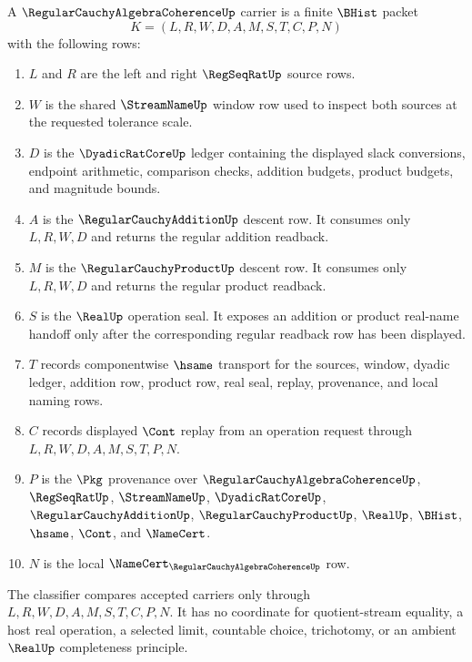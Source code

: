 \begin{definition}
\label{def:regular-cauchy-algebra-coherence-carrier}
A $\RegularCauchyAlgebraCoherenceUp$ carrier is a finite $\BHist$ packet
$$
K=(L,R,W,D,A,M,S,T,C,P,N)
$$
with the following rows:
\begin{enumerate}
\item $L$ and $R$ are the left and right $\RegSeqRatUp$ source rows.
\item $W$ is the shared $\StreamNameUp$ window row used to inspect both sources at the requested tolerance scale.
\item $D$ is the $\DyadicRatCoreUp$ ledger containing the displayed slack conversions, endpoint arithmetic, comparison checks, addition budgets, product budgets, and magnitude bounds.
\item $A$ is the $\RegularCauchyAdditionUp$ descent row. It consumes only $L,R,W,D$ and returns the regular addition readback.
\item $M$ is the $\RegularCauchyProductUp$ descent row. It consumes only $L,R,W,D$ and returns the regular product readback.
\item $S$ is the $\RealUp$ operation seal. It exposes an addition or product real-name handoff only after the corresponding regular readback row has been displayed.
\item $T$ records componentwise $\hsame$ transport for the sources, window, dyadic ledger, addition row, product row, real seal, replay, provenance, and local naming rows.
\item $C$ records displayed $\Cont$ replay from an operation request through $L,R,W,D,A,M,S,T,P,N$.
\item $P$ is the $\Pkg$ provenance over $\RegularCauchyAlgebraCoherenceUp$, $\RegSeqRatUp$, $\StreamNameUp$, $\DyadicRatCoreUp$, $\RegularCauchyAdditionUp$, $\RegularCauchyProductUp$, $\RealUp$, $\BHist$, $\hsame$, $\Cont$, and $\NameCert$.
\item $N$ is the local $\NameCert_{\RegularCauchyAlgebraCoherenceUp}$ row.
\end{enumerate}
The classifier compares accepted carriers only through $L,R,W,D,A,M,S,T,C,P,N$. It has no coordinate for quotient-stream equality, a host real operation, a selected limit, countable choice, trichotomy, or an ambient $\RealUp$ completeness principle.
\end{definition}


